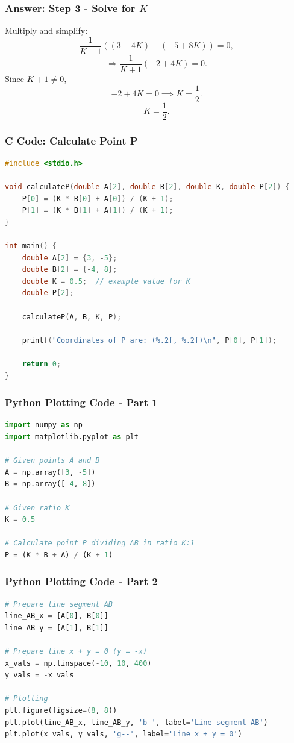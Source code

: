 \documentclass{beamer}
\begin{document}
\begin{frame}
\frametitle{\textbf{Answer: Step 3 - Solve for \(K\)}}
Multiply and simplify:
\[
\frac{1}{K+1} \left( (3 - 4K) + (-5 + 8K) \right) = 0,
\]
\[
\Rightarrow \frac{1}{K+1} (-2 + 4K) = 0.
\]
Since \(K+1 \neq 0\),
\[
-2 + 4K = 0 \implies K = \frac{1}{2}.
\]
\[
\boxed{K = \frac{1}{2}}.
\]
\end{frame}

\begin{frame}[fragile]
\frametitle{\textbf{C Code: Calculate Point P}}
\begin{lstlisting}[language=C]
#include <stdio.h>

void calculateP(double A[2], double B[2], double K, double P[2]) {
    P[0] = (K * B[0] + A[0]) / (K + 1);
    P[1] = (K * B[1] + A[1]) / (K + 1);
}

int main() {
    double A[2] = {3, -5};
    double B[2] = {-4, 8};
    double K = 0.5;  // example value for K
    double P[2];

    calculateP(A, B, K, P);

    printf("Coordinates of P are: (%.2f, %.2f)\n", P[0], P[1]);

    return 0;
}
\end{lstlisting}
\end{frame}

\begin{frame}[fragile]
\frametitle{\textbf{Python Plotting Code - Part 1}}
\begin{lstlisting}[language=Python]
import numpy as np
import matplotlib.pyplot as plt

# Given points A and B
A = np.array([3, -5])
B = np.array([-4, 8])

# Given ratio K
K = 0.5

# Calculate point P dividing AB in ratio K:1
P = (K * B + A) / (K + 1)
\end{lstlisting}
\end{frame}

\begin{frame}[fragile]
\frametitle{\textbf{Python Plotting Code - Part 2}}
\begin{lstlisting}[language=Python]
# Prepare line segment AB
line_AB_x = [A[0], B[0]]
line_AB_y = [A[1], B[1]]

# Prepare line x + y = 0 (y = -x)
x_vals = np.linspace(-10, 10, 400)
y_vals = -x_vals

# Plotting
plt.figure(figsize=(8, 8))
plt.plot(line_AB_x, line_AB_y, 'b-', label='Line segment AB')
plt.plot(x_vals, y_vals, 'g--', label='Line x + y = 0')
\end{lstlisting}
\end{frame}
\end{document}
